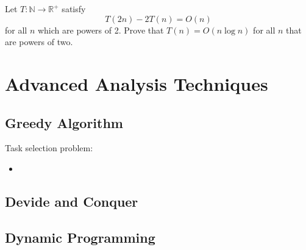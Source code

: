 \newpage


\begin{exercise}
Let $T: \mathbb{N} \rightarrow \mathbb{R}^+$ satisfy
\[
    T(2n) - 2T(n) = O(n)
\]
for all $n$ which are powers of 2. Prove that $T(n) = O(n \log n)$ for all $n$ that are powers of two.
\end{exercise}

\chapter{Advanced Analysis Techniques}

\section{Greedy Algorithm}
\begin{exercise}
Task selection problem:
\begin{itemize}
    \item   
\end{itemize}
\end{exercise}


\section{Devide and Conquer}

\section{Dynamic Programming}
